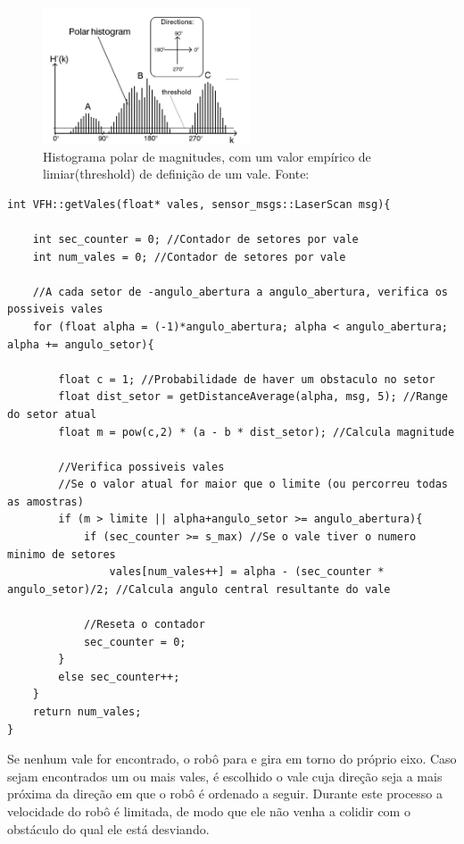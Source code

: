 \begin{figure}[!h]
    \centering
    \includegraphics[width=0.55\textwidth]{img/polar_histogram}
    \caption{Histograma polar de magnitudes, com um valor empírico de
      limiar(threshold) de definição de um vale. Fonte: \cite{c1}}
    \label{fig:polar_hist}
\end{figure}

\begin{lstlisting}[frame=single, label=cod:vales, style=customc, caption={Algoritmo de Verificação de Vales}]
int VFH::getVales(float* vales, sensor_msgs::LaserScan msg){
    
    int sec_counter = 0; //Contador de setores por vale
    int num_vales = 0; //Contador de setores por vale
    
    //A cada setor de -angulo_abertura a angulo_abertura, verifica os possiveis vales
    for (float alpha = (-1)*angulo_abertura; alpha < angulo_abertura; alpha += angulo_setor){
        
        float c = 1; //Probabilidade de haver um obstaculo no setor
        float dist_setor = getDistanceAverage(alpha, msg, 5); //Range do setor atual
        float m = pow(c,2) * (a - b * dist_setor); //Calcula magnitude
        
        //Verifica possiveis vales
        //Se o valor atual for maior que o limite (ou percorreu todas as amostras)
        if (m > limite || alpha+angulo_setor >= angulo_abertura){
            if (sec_counter >= s_max) //Se o vale tiver o numero minimo de setores
                vales[num_vales++] = alpha - (sec_counter * angulo_setor)/2; //Calcula angulo central resultante do vale
            
            //Reseta o contador
            sec_counter = 0;
        }
        else sec_counter++;
    }
    return num_vales;
}
\end{lstlisting}


Se nenhum vale for encontrado, o robô para e gira em torno do próprio
eixo. Caso sejam encontrados um ou mais vales, é escolhido o vale cuja
direção seja a mais próxima da direção em que o robô é ordenado a
seguir. Durante este processo a velocidade do robô é limitada, de modo
que ele não venha a colidir com o obstáculo do qual ele está
desviando.

